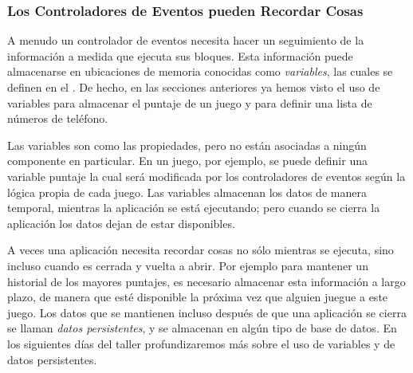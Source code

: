 \documentclass[letterpaper]{article}
\begin{document}
\subsubsection*{Los Controladores de Eventos pueden Recordar Cosas}

A menudo un controlador de eventos necesita hacer un seguimiento de la
información a medida que ejecuta sus bloques. Esta información puede
almacenarse en ubicaciones de memoria conocidas como \emph{variables}, las
cuales se definen en el \blockEditor. De hecho, en las secciones
anteriores ya hemos visto el uso de variables para almacenar el
puntaje de un juego y para definir una lista de números de teléfono.

Las variables son como las propiedades, pero no están asociadas a
ningún componente en particular. En un juego, por ejemplo, se puede
definir una variable puntaje la cual será modificada por los
controladores de eventos según la lógica propia de cada juego. Las
variables almacenan los datos de manera temporal, mientras la
aplicación se está ejecutando; pero cuando se cierra la aplicación los
datos dejan de estar disponibles.

A veces una aplicación necesita recordar cosas no sólo mientras se
ejecuta, sino incluso cuando es cerrada y vuelta a abrir. Por ejemplo
para mantener un historial de los mayores puntajes, es necesario
almacenar esta información a largo plazo, de manera que esté
disponible la próxima vez que alguien juegue a este juego. Los datos
que se mantienen incluso después de que una aplicación se cierra se
llaman \emph{datos persistentes}, y se almacenan en algún tipo de base
de datos. En los siguientes días del taller profundizaremos más sobre
el uso de variables y de datos persistentes.
\end{document}
